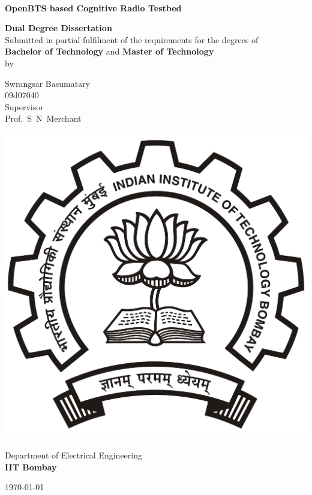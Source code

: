 \begin{titlepage}
\begin{center}
\begin{spacing}{1.0}


~\\[0.3cm]
{ \LARGE \bfseries OpenBTS based Cognitive Radio Testbed\\[1.2cm] }

\textbf{\large Dual Degree Dissertation}\\[1.2cm]

{Submitted in partial fulfilment of the requirements for the degrees 
of\\[0.1cm]
\textbf{Bachelor of Technology} and \textbf{Master of Technology}\\[0.3cm]
by\\[0.3cm]}

{\LARGE Swrangsar Basumatary \\[0.1cm]}
{09d07040 \\[1.1cm]}
{Supervisor \\[0.1cm]}
{\LARGE Prof.~S~N~Merchant \\[1.3cm]}

\includegraphics[width=0.21\textheight]{iitbLogo}~\\[0.9cm]
Department of Electrical Engineering\\[0.2cm]
\textbf{\large IIT Bombay}\\[1.3cm]


\vfill

{\large \mydate\today}

\end{spacing}
\end{center}
\end{titlepage}
